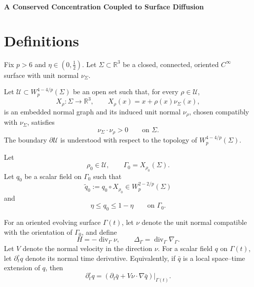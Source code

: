 \documentclass[10pt,a4paper]{article}
\theoremstyle{definition}
\begin{document}
\begin{center}
  {\Large\bfseries A Conserved Concentration Coupled to Surface Diffusion}
\end{center}

\section{Definitions}

Fix $p>6$ and $\eta\in(0,\tfrac12)$. Let
$\Sigma\subset\mathbb R^3$ be a closed, connected, oriented $C^\infty$
surface with unit normal $\nu_\Sigma$.

Let $\mathcal U\subset W_p^{4-4/p}(\Sigma)$ be an open set such that, for
every $\rho\in\mathcal U$,
\begin{equation}
  X_\rho:\Sigma\longrightarrow\mathbb R^3,
  \qquad
  X_\rho(x)=x+\rho(x)\nu_\Sigma(x),
\end{equation}
is an embedded normal graph and its induced unit normal $\nu_\rho$, chosen
compatibly with $\nu_\Sigma$, satisfies
\begin{equation}
  \nu_\Sigma\cdot\nu_\rho>0
  \qquad\text{on }\Sigma.
\end{equation}
The boundary $\partial\mathcal U$ is understood with respect to the topology
of $W_p^{4-4/p}(\Sigma)$.

Let
\begin{equation}
  \rho_0\in\mathcal U,
  \qquad
  \Gamma_0=X_{\rho_0}(\Sigma).
\end{equation}
Let $q_0$ be a scalar field on $\Gamma_0$ such that
\begin{equation}
  \widetilde q_0:=q_0\circ X_{\rho_0}
  \in W_p^{2-2/p}(\Sigma)
\end{equation}
and
\begin{equation}
  \eta\leq q_0\leq1-\eta
  \qquad\text{on }\Gamma_0.
\end{equation}

For an oriented evolving surface $\Gamma(t)$, let $\nu$ denote the unit
normal compatible with the orientation of $\Gamma_0$, and define
\begin{equation}
  H=-\operatorname{div}_\Gamma\nu,
  \qquad
  \Delta_\Gamma=\operatorname{div}_\Gamma\nabla_\Gamma.
\end{equation}
Let $V$ denote the normal velocity in the direction $\nu$. For a scalar field
$q$ on $\Gamma(t)$, let $\partial_t^\circ q$ denote its normal time
derivative. Equivalently, if $\bar q$ is a local space--time extension of
$q$, then
\begin{equation}
  \partial_t^\circ q
  =
  \left(
    \partial_t\bar q+V\nu\cdot\nabla\bar q
  \right)\big|_{\Gamma(t)}.
\end{equation}
\end{document}
